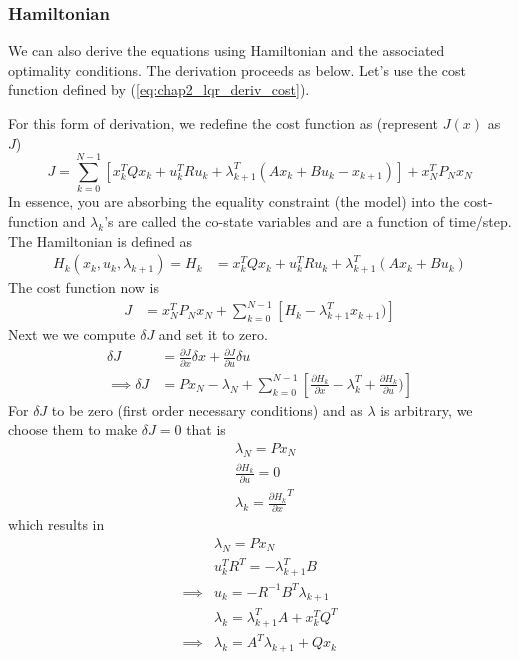 \subsubsection{Hamiltonian}
We can also derive the equations using Hamiltonian and the associated optimality conditions. The derivation proceeds as below.
Let's use the cost function defined by (\ref{eq:chap2_lqr_deriv_cost}).

For this form of derivation, we redefine the cost function as (represent $J(x)$ as $J$)
\begin{dmath*}
    J = \sum_{k=0}^{N-1}\left[x_k^TQx_k + u_k^TRu_k + \lambda_{k+1}^T (Ax_k+Bu_k - x_{k+1})\right] + x^T_NP_Nx_N
\end{dmath*}
In essence, you are absorbing the equality constraint (the model) into the cost-function and $\lambda_k$'s are called the co-state variables and are a function of time/step.
The Hamiltonian is defined as
\begin{align}
    H_k(x_k, u_k, \lambda_{k+1}) = H_k &= x_k^TQx_k + u_k^TRu_k + \lambda_{k+1}^T (Ax_k+Bu_k)
\end{align}
The cost function now is
\begin{align}
    J &= x^T_NP_Nx_N +  \sum_{k=0}^{N-1}\left[H_k - \lambda_{k+1}^Tx_{k+1})\right]
\end{align}
Next we we compute $\delta J$ and set it to zero.
\begin{align}
    \delta J &= \frac{\partial{J}}{\partial x} \delta x + \frac{\partial{J}}{\partial u} \delta u \\
    \implies \delta J &= Px_N - \lambda_N + \sum_{k=0}^{N-1}\left[\frac{\partial{H_k}}{\partial x} - \lambda_{k}^T + \frac{\partial{H_k}}{\partial u})\right]
\end{align}
For $\delta J$ to be zero (first order necessary conditions) and as $\lambda$ is arbitrary, we choose them to make $\delta J = 0$ that is
\begin{align}
    & \lambda_N = Px_N \\
    & \frac{\partial{H_k}}{\partial u} = 0 \\
    & \lambda_{k} = {\frac{\partial{H_k}}{\partial x}}^T
\end{align}
which results in 
\begin{align}
    & \lambda_N = Px_N \\
    & u_k^TR^T = -\lambda_{k+1}^TB\\
    \implies &u_k = -R^{-1}B^T\lambda_{k+1} \\
    & \lambda_{k} = \lambda_{k+1}^TA + x_k^TQ^T \\
    \implies &\lambda_{k} = A^T\lambda_{k+1} + Qx_k
\end{align}

